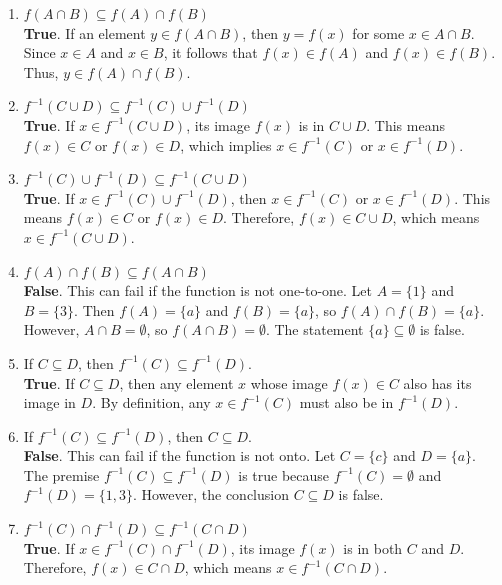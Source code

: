 \documentclass[10pt]{article}
\theoremstyle{definition}
\theoremstyle{plain}
\numberwithin{equation}{section}
\begin{document}
\begin{enumerate}
  \item $f(A \cap B) \subseteq f(A) \cap f(B)$ \\
  \textbf{True}. If an element $y \in f(A \cap B)$, then $y = f(x)$ for some $x \in A \cap B$. Since $x \in A$ and $x \in B$, it follows that $f(x) \in f(A)$ and $f(x) \in f(B)$. Thus, $y \in f(A) \cap f(B)$.

  \item $f^{-1}(C \cup D) \subseteq f^{-1}(C) \cup f^{-1}(D)$ \\
  \textbf{True}. If $x \in f^{-1}(C \cup D)$, its image $f(x)$ is in $C \cup D$. This means $f(x) \in C$ or $f(x) \in D$, which implies $x \in f^{-1}(C)$ or $x \in f^{-1}(D)$.

  \item $f^{-1}(C) \cup f^{-1}(D) \subseteq f^{-1}(C \cup D)$ \\
  \textbf{True}. If $x \in f^{-1}(C) \cup f^{-1}(D)$, then $x \in f^{-1}(C)$ or $x \in f^{-1}(D)$. This means $f(x) \in C$ or $f(x) \in D$. Therefore, $f(x) \in C \cup D$, which means $x \in f^{-1}(C \cup D)$.

  \item $f(A) \cap f(B) \subseteq f(A \cap B)$ \\
  \textbf{False}. This can fail if the function is not one-to-one. Let $A=\{1\}$ and $B=\{3\}$. Then $f(A)=\{a\}$ and $f(B)=\{a\}$, so $f(A) \cap f(B) = \{a\}$. However, $A \cap B = \emptyset$, so $f(A \cap B) = \emptyset$. The statement $\{a\} \subseteq \emptyset$ is false.

  \item If $C \subseteq D$, then $f^{-1}(C) \subseteq f^{-1}(D)$. \\
  \textbf{True}. If $C \subseteq D$, then any element $x$ whose image $f(x) \in C$ also has its image in $D$. By definition, any $x \in f^{-1}(C)$ must also be in $f^{-1}(D)$.

  \item If $f^{-1}(C) \subseteq f^{-1}(D)$, then $C \subseteq D$. \\
  \textbf{False}. This can fail if the function is not onto. Let $C=\{c\}$ and $D=\{a\}$. The premise $f^{-1}(C) \subseteq f^{-1}(D)$ is true because $f^{-1}(C) = \emptyset$ and $f^{-1}(D)=\{1,3\}$. However, the conclusion $C \subseteq D$ is false.

  \item $f^{-1}(C) \cap f^{-1}(D) \subseteq f^{-1}(C \cap D)$ \\
  \textbf{True}. If $x \in f^{-1}(C) \cap f^{-1}(D)$, its image $f(x)$ is in both $C$ and $D$. Therefore, $f(x) \in C \cap D$, which means $x \in f^{-1}(C \cap D)$.


\end{enumerate}
\end{document}
